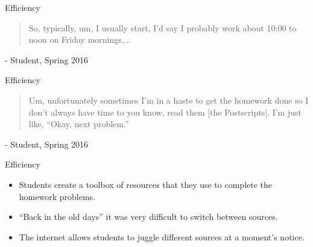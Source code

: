 \documentclass[xcolor=x11names,compress]{beamer}
\begin{document}
\begin{frame}{Efficiency}
	\begin{quote}
		So, typically, um, I usually start, I'd say I probably work about 10:00 to noon on Friday mornings,...
	\end{quote}
	\vspace{5mm}
	- Student, Spring 2016
\end{frame}

\begin{frame}{Efficiency}
	\begin{quote}
		Um, unfortunately sometimes I'm in a haste to get the homework done so I don't always have time to you know, read them [the Postscripts]. I'm just like, ``Okay, next problem.''
	\end{quote}
	\vspace{5mm}
	- Student, Spring 2016
\end{frame}

\begin{frame}{Efficiency}
	\begin{itemize}
		\item Students create a toolbox of resources that they use to complete the homework problems.
		\item ``Back in the old days'' it was very difficult to switch between sources.
		\item The internet allows students to juggle different sources at a moment's notice.
	\end{itemize}
\end{frame}
\end{document}
